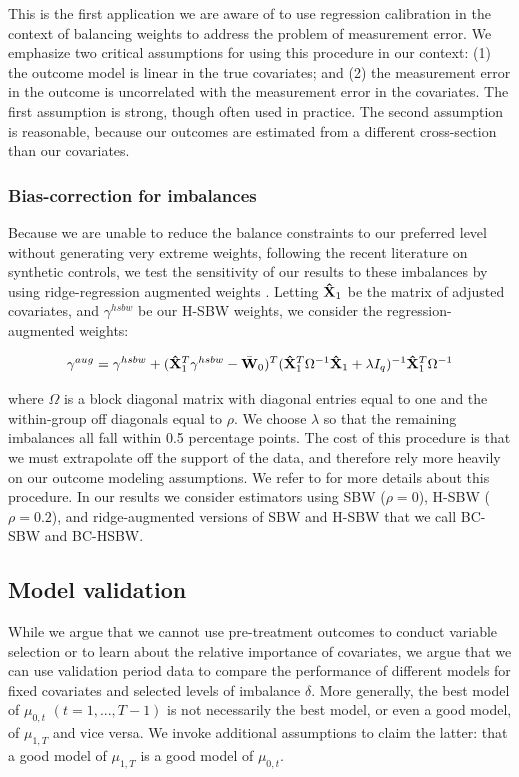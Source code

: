 This is the first application we are aware of to use regression calibration in the context of balancing weights to address the problem of measurement error. We emphasize two critical assumptions for using this procedure in our context: (1) the outcome model is linear in the true covariates; and (2) the measurement error in the outcome is uncorrelated with the measurement error in the covariates. The first assumption is strong, though often used in practice. The second assumption is reasonable, because our outcomes are estimated from a different cross-section than our covariates. 

\subsubsection{Bias-correction for imbalances}

Because we are unable to reduce the balance constraints to our preferred level without generating very extreme weights, following the recent literature on synthetic controls, we test the sensitivity of our results to these imbalances by using ridge-regression augmented weights \cite{ben2018augmented}. Letting $\mathbf{\hat{X}}_1$ be the matrix of adjusted covariates, and $\gamma^{hsbw}$ be our H-SBW weights, we consider the regression-augmented weights:

\begin{equation}
\gamma^{aug} = \gamma^{hsbw} + (\matr{\hat{X}}_1^T\gamma^{hsbw} - \bar{\matr{W}}_0)^T(\matr{\hat{X}}_1^T\Omega^{-1}\matr{\hat{X}}_1 + \lambda I_q)^{-1}\matr{\hat{X}}_1^T\Omega^{-1}
\end{equation}

where $\Omega$ is a block diagonal matrix with diagonal entries equal to one and the within-group off diagonals equal to $\rho$. We choose $\lambda$ so that the remaining imbalances all fall within 0.5 percentage points. The cost of this procedure is that we must extrapolate off the support of the data, and therefore rely more heavily on our outcome modeling assumptions. We refer to \cite{ben2018augmented} for more details about this procedure. In our results we consider estimators using SBW ($\rho = 0$), H-SBW ($\rho = 0.2$), and ridge-augmented versions of SBW and H-SBW that we call BC-SBW and BC-HSBW. 

\subsection{Model validation}

While we argue that we cannot use pre-treatment outcomes to conduct variable selection or to learn about the relative importance of covariates, we argue that we can use validation period data to compare the performance of different models for fixed covariates and selected levels of imbalance $\delta$. More generally, the best model of $\mu_{0, t}$ $(t = 1,..., T-1)$ is not necessarily the best model, or even a good model, of $\mu_{1, T}$ and vice versa. We invoke additional assumptions to claim the latter: that a good model of $\mu_{1, T}$ is a good model of $\mu_{0, t}$.

